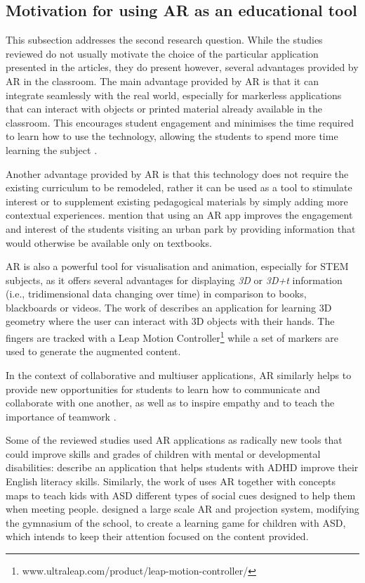 \subsection{Motivation for using AR as an educational tool}

This subsection addresses the second research question. While the studies reviewed do not usually motivate the choice of the particular application presented in the articles, they do present however, several advantages provided by AR in the classroom. The main advantage provided by AR is that it can integrate seamlessly with the real world, especially for markerless applications that can interact with objects or printed material already available in the classroom. This encourages student engagement and minimises the time required to learn how to use the technology, allowing the students to spend more time learning the subject \citep{thamrongrat2019design}.

Another advantage provided by AR is that this technology does not require the existing curriculum to be remodeled, rather it can be used as a tool to stimulate interest or to supplement existing pedagogical materials by simply adding more contextual experiences. \citet{pombo2018edupark} mention that using an AR app improves the engagement and interest of the students visiting an urban park by providing information that would otherwise be available only on textbooks.

AR is also a powerful tool for visualisation and animation, especially for STEM subjects, as it offers several advantages for displaying \emph{3D} or \emph{3D+t} information (i.e., tridimensional data changing over time) in comparison to books, blackboards or videos. The work of \citet{cao2019hand} describes an application for learning 3D geometry where the user can interact with 3D objects with their hands. The fingers are tracked with a Leap Motion Controller\footnote{www.ultraleap.com/product/leap-motion-controller/} while a set of markers are used to generate the augmented content.

In the context of collaborative and multiuser applications, AR similarly helps to provide new opportunities for students to learn how to communicate and collaborate with one another, as well as to inspire empathy and to teach the importance of teamwork \citep{hill2013classroom}.

Some of the reviewed studies used AR applications as radically new tools that could improve skills and grades of children with mental or developmental disabilities: \citet{luna2018words} describe an application that helps students with \gls{ADHD} improve their English literacy skills. Similarly, the work of \citet{chen2019effects} uses AR together with concepts maps to teach kids with \gls{ASD} different types of social cues designed to help them when meeting people. \citet{takahashi2018empathic} designed a large scale AR and projection system, modifying the gymnasium of the school, to create a learning game for children with \gls{ASD}, which intends to keep their attention focused on the content provided.

